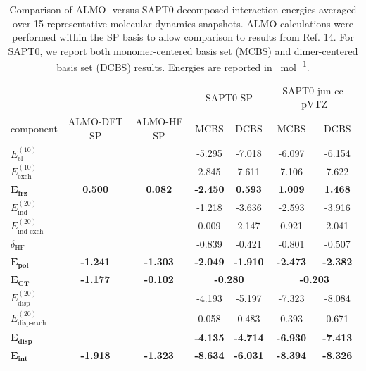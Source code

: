 \begin{table}
  \centering
  \caption[Comparison of ALMO and SAPT interaction energies for MD clusters]{Comparison of ALMO- versus SAPT0-decomposed interaction energies averaged over \num{15} representative molecular dynamics snapshots. ALMO calculations were performed within the SP basis to allow comparison to results from Ref. 14. For SAPT0, we report both monomer-centered basis set (MCBS) and dimer-centered basis set (DCBS) results. Energies are reported in \si{\kcal\per\mole}.}
  \label{paper_02:tab:6}
  \begin{tabular}{lcccccc}
    & & & \multicolumn{2}{c}{SAPT0 SP} & \multicolumn{2}{c}{SAPT0 jun-cc-pVTZ} \\
    component & ALMO-DFT SP & ALMO-HF SP & MCBS & DCBS & MCBS & DCBS \\
    \(E_{\text{el}}^{(10)}\) & \textemdash{} & \textemdash{} & -5.295 & -7.018 & -6.097 & -6.154 \\
    \(E_{\text{exch}}^{(10)}\) & \textemdash{} & \textemdash{} & 2.845 & 7.611 & 7.106 & 7.622 \\
    \(\mathbf{E_{\textbf{frz}}}\) & \textbf{0.500} & \textbf{0.082} & \textbf{-2.450} & \textbf{0.593} & \textbf{1.009} & \textbf{1.468} \\
    \(E_{\text{ind}}^{(20)}\) & \textemdash{} & \textemdash{} & -1.218 & -3.636 & -2.593 & -3.916 \\
    \(E_{\text{ind-exch}}^{(20)}\) & \textemdash{} & \textemdash{} & 0.009 & 2.147 & 0.921 & 2.041 \\
    \(\delta_{\text{HF}}\) & \textemdash{} & \textemdash{} & -0.839 & -0.421 & -0.801 & -0.507 \\
    \(\mathbf{E_{\textbf{pol}}}\) & \textbf{-1.241} & \textbf{-1.303} & \textbf{-2.049} & \textbf{-1.910} & \textbf{-2.473} & \textbf{-2.382} \\
    \(\mathbf{E_{\textbf{CT}}}\) & \textbf{-1.177} & \textbf{-0.102} & \multicolumn{2}{c}{\textbf{-0.280}} & \multicolumn{2}{c}{\textbf{-0.203}} \\
    \(E_{\text{disp}}^{(20)}\) & \textemdash{} & \textemdash{} & -4.193 & -5.197 & -7.323 & -8.084 \\
    \(E_{\text{disp-exch}}^{(20)}\) & \textemdash{} & \textemdash{} & 0.058 & 0.483 & 0.393 & 0.671 \\
    \(\mathbf{E_{\textbf{disp}}}\) & \textbf{\textemdash{}} & \textbf{\textemdash{}} & \textbf{-4.135} & \textbf{-4.714} & \textbf{-6.930} & \textbf{-7.413} \\
    \(\mathbf{E_{\textbf{int}}}\) & \textbf{-1.918} & \textbf{-1.323} & \textbf{-8.634} & \textbf{-6.031} & \textbf{-8.394} & \textbf{-8.326}
  \end{tabular}
\end{table}

